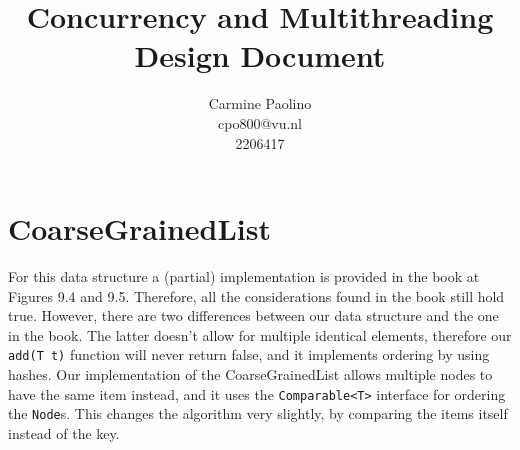 \documentclass[12pt, oneside]{article}   	%
\title{Concurrency and Multithreading\\
Design Document}
\author{Carmine Paolino\\
cpo800@vu.nl\\
2206417}
\date{}							%
\begin{document}
\maketitle
% 
% 

\section{CoarseGrainedList}\label{sec:coarse_grained_list}
For this data structure a (partial) implementation is provided in the book at Figures 9.4 and 9.5. Therefore, all the considerations found in the book still hold true. However, there are two differences between our data structure and the one in the book. The latter doesn't allow for multiple identical elements, therefore our \texttt{add(T t)} function will never return false, and it implements ordering by using hashes. Our implementation of the CoarseGrainedList allows multiple nodes to have the same item instead, and it uses the \texttt{Comparable<T>} interface for ordering the \texttt{Node}s. This changes the algorithm very slightly, by comparing the items itself instead of the key.
\end{document}
